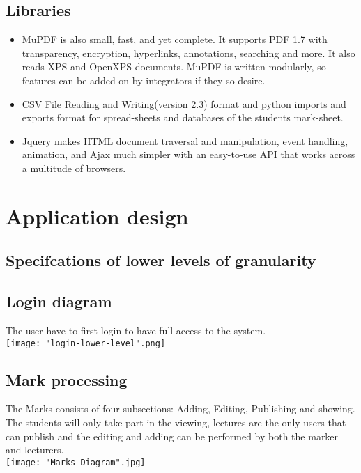 \documentclass[10pt,a4paper]{article}
\begin{document}
\textbf {\textbf{}}
\subsection{Libraries}
\begin{itemize}
\item {	MuPDF is also small, fast, and yet complete. It supports PDF 1.7 with transparency, encryption, hyperlinks, annotations, searching and more. It also reads XPS and OpenXPS documents. MuPDF is written modularly, so features can be added on by integrators if they so desire.}
\item {CSV File Reading and Writing(version 2.3) format and python  imports and exports format for spread-sheets and databases of the students mark-sheet.}
\item {	Jquery makes  HTML document traversal and manipulation, event handling, animation, and Ajax much simpler with an easy-to-use API that works across a multitude of browsers.}
\end{itemize}

\section{Application design}

\subsection{Specifcations of lower levels of granularity}

\subsection*{Login diagram}
The user have to first login to have full access to the system.\\
\texttt{[image: "login-lower-level".png]}\\

\subsection*{Mark processing}
The Marks consists of four subsections: Adding, Editing, Publishing and showing. The students will only take part in the viewing, lectures are the only users that can publish and the editing and adding can be performed by both the marker and lecturers.\\
\texttt{[image: "Marks\_Diagram".jpg]}\\
\end{document}
